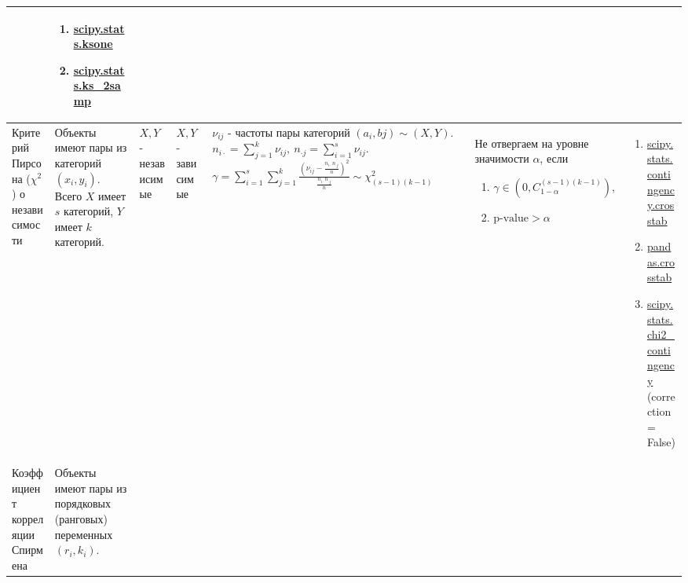 \documentclass[14pt, a1paper, fleqn]{extarticle}
\begin{document}
\begin{center}
\begin{tabular}{|p{6cm}|p{8cm}|p{3cm}|p{3cm}|p{9cm}|p{10cm}|p{14cm}|}
\begin{enumerate}
            \end{enumerate} 
            & \begin{enumerate}
                \item \href{https://docs.scipy.org/doc/scipy/reference/generated/scipy.stats.ksone.html}{scipy.stats.ksone}
                \item \href{https://docs.scipy.org/doc/scipy/reference/generated/scipy.stats.ks_2samp.html}{scipy.stats.ks\_2samp}
            \end{enumerate} \\
            \hline
            Критерий Пирсона (\( \chi^2 \)) о независимости
            & Объекты имеют пары из категорий \( (x_i, y_i) \). Всего \( X \) имеет \( s \) категорий, \( Y \) имеет \( k \) категорий.
            & \( X, Y \) - независимые
            & \( X, Y \) - зависимые 
            & \( \nu_{ij} \) - частоты пары категорий \( (a_{i}, b{j}) \sim (X,  Y) \).
            \newline
            \( n_{i \cdot} = \sum_{j=1}^{k} \nu_{ij}, ~ n_{\cdot j} = \sum_{i=1}^{s} \nu_{ij} \).
            \newline
            \( \gamma = \sum_{i=1}^{s} \sum_{j=1}^{k} \frac{\left( \nu_{ij} - \frac{n_{i \cdot} n_{\cdot j}}{n} \right)^2}{\frac{n_{i \cdot} n_{\cdot j}}{n}} \sim \chi^2_{(s-1)(k-1)} \)
            & Не отвергаем на уровне значимости \( \alpha \), если 
            \begin{enumerate}
                \item \( \gamma \in (0,  C^{(s-1)(k-1)}_{1-\alpha}) \),
                \item \( \text{p-value} > \alpha \)
            \end{enumerate} 
            & \begin{enumerate}
                \item \href{https://docs.scipy.org/doc/scipy/reference/generated/scipy.stats.contingency.crosstab.html}{scipy.stats.contingency.crosstab}
                \item \href{https://pandas.pydata.org/docs/reference/api/pandas.crosstab.html}{pandas.crosstab}
                \item \href{https://docs.scipy.org/doc/scipy/reference/generated/scipy.stats.chi2_contingency.html}{scipy.stats.chi2\_contingency} (correction = False)
            \end{enumerate} \\
            \hline
            Коэффициент корреляции Спирмена
            & Объекты имеют пары из порядковых (ранговых) переменных \( (r_i, k_i) \).

\end{tabular}
\end{center}
\end{document}
